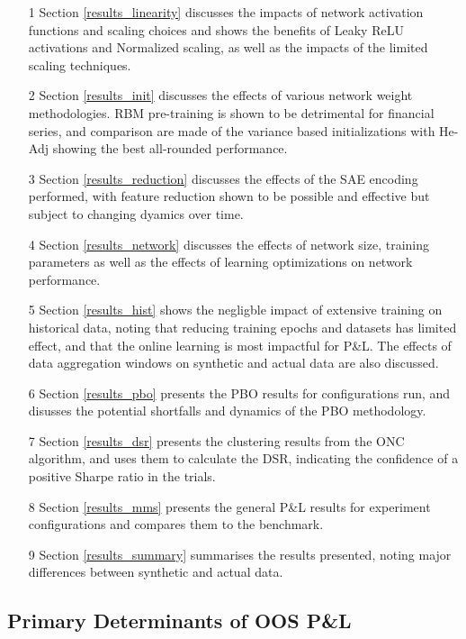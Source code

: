 \documentclass[a4paper,11pt,oneside]{article}
\theoremstyle{plain}
\theoremstyle{definition}
\begin{document}
	\begin{itemize}
		\item[1] Section \ref{results_linearity} discusses the impacts of network activation functions and scaling choices and shows the benefits of Leaky ReLU activations and Normalized scaling, as well as the impacts of the limited scaling techniques.
		\item[2] Section \ref{results_init} discusses the effects of various network weight methodologies. RBM pre-training is shown to be detrimental for financial series, and comparison are made of the variance based initializations with He-Adj showing the best all-rounded performance.
		\item[3] Section \ref{results_reduction} discusses the effects of the SAE encoding performed, with feature reduction shown to be possible and effective but subject to changing dyamics over time.
		\item[4] Section \ref{results_network} discusses the effects of network size, training parameters as well as the effects of learning optimizations on network performance.
		\item[5] Section \ref{results_hist} shows the negligble impact of extensive training on historical data, noting that reducing training epochs and datasets has limited effect, and that the online learning is most impactful for P\&L. The effects of data aggregation windows on synthetic and actual data are also discussed.
		\item[6] Section \ref{results_pbo} presents the PBO results for configurations run, and disusses the potential shortfalls and dynamics of the PBO methodology.
		\item[7] Section \ref{results_dsr} presents the clustering results from the ONC algorithm, and uses them to calculate the DSR, indicating the confidence of a positive Sharpe ratio in the trials.
		\item[8] Section \ref{results_mms} presents the general P\&L results for experiment configurations and compares them to the benchmark.
		\item[9] Section \ref{results_summary} summarises the results presented, noting major differences between synthetic and actual data.
	\end{itemize}
	
	
	\newpage
	\subsection{Primary Determinants of OOS P\&L}\label{results_oos_pl}
	
\end{document}
